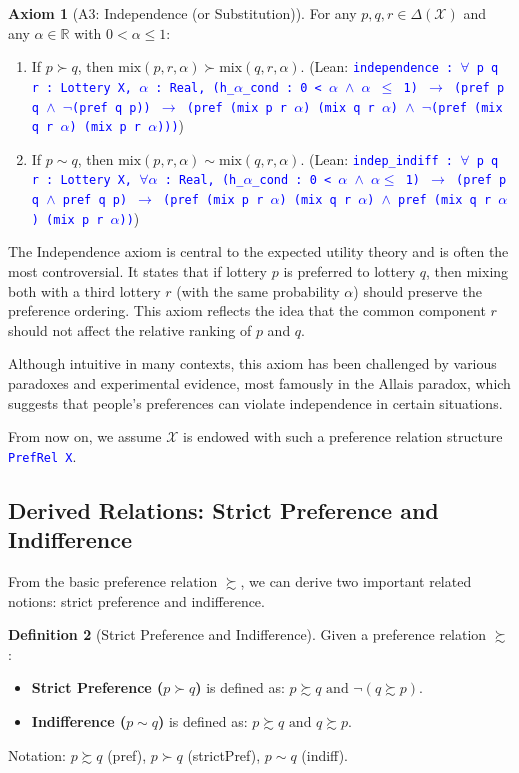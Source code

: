 \documentclass{article}
\theoremstyle{definition}
\newtheorem{definition}{Definition}[section]
\newtheorem{axiom}[definition]{Axiom}
\newcommand{\R}{\mathbb{R}}
\newcommand{\X}{\mathcal{X}}
\newcommand{\tactic}[1]{\textcolor{blue}{\texttt{#1}}}
\newcommand{\DeltaX}{\Delta(\X)} %
\newcommand{\pref}{\succsim} %
\newcommand{\strictpref}{\succ} %
\newcommand{\indiff}{\sim} %
\newcommand{\mix}{\mathrm{mix}} %
\begin{document}
\begin{axiom}[A3: Independence (or Substitution)]\label{ax:independence}
For any $p, q, r \in \DeltaX$ and any $\alpha \in \R$ with $0 < \alpha \le 1$:
\begin{enumerate}[label=(\alph*)]
    \item If $p \strictpref q$, then $\mix(p, r, \alpha) \strictpref \mix(q, r, \alpha)$.
    (Lean: \tactic{independence : $\forall$ p q r : Lottery X, $\alpha$ : Real, (h\_$\alpha$\_cond : 0 < $\alpha$ $\wedge$ $\alpha$ $\leq$ 1) $\rightarrow$ (pref p q $\wedge$ $\lnot$(pref q p)) $\rightarrow$ (pref (mix p r $\alpha$) (mix q r $\alpha$) $\wedge$ $\lnot$(pref (mix q r $\alpha$) (mix p r $\alpha$)))})
    \item If $p \indiff q$, then $\mix(p, r, \alpha) \indiff \mix(q, r, \alpha)$.
    (Lean: \tactic{indep\_indiff : $\forall$ p q r : Lottery X, $\forall\alpha$ : Real, (h\_$\alpha$\_cond : 0 < $\alpha$ $\wedge$ $\alpha\leq$ 1) $\rightarrow$ (pref p q $\wedge$ pref q p) $\rightarrow$ (pref (mix p r $\alpha$) (mix q r $\alpha$) $\wedge$ pref (mix q r $\alpha$) (mix p r $\alpha$))})
\end{enumerate}
\end{axiom}

The Independence axiom is central to the expected utility theory and is often the most controversial. It states that if lottery $p$ is preferred to lottery $q$, then mixing both with a third lottery $r$ (with the same probability $\alpha$) should preserve the preference ordering. This axiom reflects the idea that the common component $r$ should not affect the relative ranking of $p$ and $q$.

Although intuitive in many contexts, this axiom has been challenged by various paradoxes and experimental evidence, most famously in the Allais paradox\cite{Allais1953}, which suggests that people's preferences can violate independence in certain situations.

From now on, we assume $\X$ is endowed with such a preference relation structure \tactic{PrefRel X}.

\subsection{Derived Relations: Strict Preference and Indifference}

From the basic preference relation $\pref$, we can derive two important related notions: strict preference and indifference.


\begin{definition}[Strict Preference and Indifference]\label{def:derived_rels}
Given a preference relation $\pref$:
\begin{itemize}
    \item \textbf{Strict Preference ($p \strictpref q$)} is defined as: $p \pref q \text{ and } \lnot(q \pref p)$.
    \item \textbf{Indifference ($p \indiff q$)} is defined as: $p \pref q \text{ and } q \pref p$.
\end{itemize}
Notation: $p \pref q$ (pref), $p \strictpref q$ (strictPref), $p \indiff q$ (indiff).
\end{definition}
\end{document}
